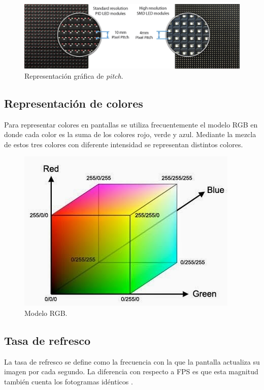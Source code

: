 \begin{figure}[htpb]
	\centering
	\includegraphics[scale=0.3]{Figures/pitch.jpg} 
	\caption{Representación gráfica de \textit{pitch}\protect\footnotemark.}
	\label{fig:pixelpitch}
\end{figure}



\subsection{Representación de colores}
Para representar colores en pantallas se utiliza frecuentemente el modelo RGB en donde cada color es la suma de los colores rojo, verde y azul. Mediante la mezcla de estos tres colores con diferente intensidad se representan distintos colores.
\begin{figure}[htpb]
	\centering
	\includegraphics[scale=0.6]{Figures/modelorgb.jpg} 
	\caption{Modelo RGB\protect\footnotemark.}
	\label{fig:grafrgb}
\end{figure}

\subsection{Tasa de refresco}
La tasa de refresco se define como la frecuencia con la que la pantalla actualiza su imagen por cada segundo. La diferencia con respecto a FPS es que esta magnitud también cuenta los fotogramas idénticos \citep{WIKITASA}.




